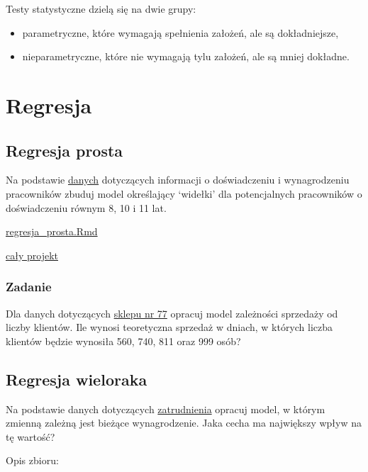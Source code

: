 \documentclass[]{book}
\providecommand{\tightlist}{%
  \setlength{\itemsep}{0pt}\setlength{\parskip}{0pt}}
\begin{document}
Testy statystyczne dzielą się na dwie grupy:

\begin{itemize}
\tightlist
\item
  parametryczne, które wymagają spełnienia założeń, ale są
  dokładniejsze,
\item
  nieparametryczne, które nie wymagają tylu założeń, ale są mniej
  dokładne.
\end{itemize}

\chapter{Regresja}\label{regresja}

\section{Regresja prosta}\label{regresja-prosta}

Na podstawie \href{data/Salary_Data.csv}{danych} dotyczących informacji
o doświadczeniu i wynagrodzeniu pracowników zbuduj model określający
`widełki' dla potencjalnych pracowników o doświadczeniu równym 8, 10 i
11 lat.

\href{res/regresja_prosta.Rmd}{regresja\_prosta.Rmd}

\href{res/adr.zip}{cały projekt}

\subsection{Zadanie}\label{zadanie}

Dla danych dotyczących \href{data/sklep77.csv}{sklepu nr 77} opracuj
model zależności sprzedaży od liczby klientów. Ile wynosi teoretyczna
sprzedaż w dniach, w których liczba klientów będzie wynosiła 560, 740,
811 oraz 999 osób?

\section{Regresja wieloraka}\label{regresja-wieloraka}

Na podstawie danych dotyczących \href{data/pracownicy.csv}{zatrudnienia}
opracuj model, w którym zmienną zależną jest bieżące wynagrodzenie. Jaka
cecha ma największy wpływ na tę wartość?

Opis zbioru:
\end{document}
